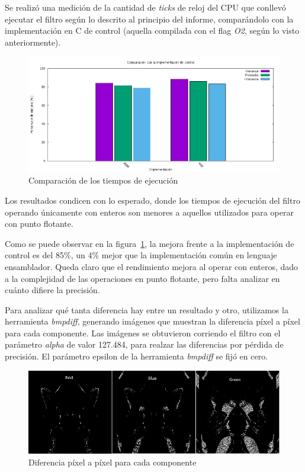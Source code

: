 \documentclass[a4paper]{article}
\begin{document}
Se realizó una medición de la cantidad de \textit{ticks} de reloj del CPU que conllevó ejecutar el filtro según lo descrito al principio del informe, comparándolo con la implementación en C de control (aquella compilada con el flag \textit{O2}, según lo visto anteriormente).
\\
\begin{figure}[H]
  \begin{center}
	\includegraphics[scale=0.6]{imagenes/combinarExp.png}
	\caption{Comparación de los tiempos de ejecución}
	\label{combinar_exp}
  \end{center}
\end{figure}

Los resultados condicen con lo esperado, donde los tiempos de ejecución del filtro operando únicamente con enteros son menores a aquellos utilizados para operar con punto flotante.

Como se puede observar en la figura~\ref{combinar_exp}, la mejora frente a la implementación de control es del 85\%, un 4\% mejor que la implementación común en lenguaje ensamblador. Queda claro que el rendimiento mejora al operar con enteros, dado a la complejidad de las operaciones en punto flotante, pero falta analizar en cuánto difiere la precisión.
\bigskip

Para analizar qué tanta diferencia hay entre un resultado y otro, utilizamos la herramienta \textit{bmpdiff}, generando imágenes que muestran la diferencia píxel a píxel para cada componente. Las imágenes se obtuvieron corriendo el filtro con el parámetro \textit{alpha} de valor 127.484, para realzar las diferencias por pérdida de precisión. El parámetro epsilon de la herramienta \textit{bmpdiff} se fijó en cero.
\\
\begin{figure}[H]
  \begin{center}
	\includegraphics[scale=0.6]{imagenes/diffExp.jpg}
	\caption{Diferencia píxel a píxel para cada componente}
	\label{combinar_diff}
  \end{center}
\end{figure}
\end{document}
